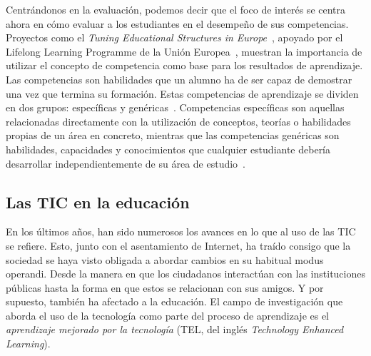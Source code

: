 Centrándonos en la evaluación, podemos decir que el foco de interés se centra ahora en cómo evaluar a los estudiantes en el desempeño de sus competencias. Proyectos como el \emph{Tuning Educational Structures in Europe}~\cite{gonzalez2005tuning}, apoyado por el Lifelong Learning Programme de la Unión Europea~\cite{llp:2006}, muestran la importancia de utilizar el concepto de competencia como base para los resultados de aprendizaje. Las competencias son habilidades que un alumno ha de ser capaz de demostrar una vez que termina su formación. Estas competencias de aprendizaje se dividen en dos grupos: específicas y genéricas~\cite{strijbos2015criteria}. Competencias específicas son aquellas relacionadas directamente con la utilización de conceptos, teorías o habilidades propias de un área en concreto, mientras que las competencias genéricas son habilidades, capacidades y conocimientos que cualquier estudiante debería desarrollar independientemente de su área de estudio~\cite{gonzalez2005tuning}. 

\subsection*{Las TIC en la educación}

En los últimos años, han sido numerosos los avances en lo que al uso de las TIC se refiere. Esto, junto con el asentamiento de Internet, ha traído consigo que la sociedad se haya visto obligada a abordar cambios en su habitual modus operandi. Desde la manera en que los ciudadanos interactúan con las instituciones públicas hasta la forma en que estos se relacionan con sus amigos. Y por supuesto, también ha afectado a la educación. El campo de investigación que aborda el uso de la tecnología como parte del proceso de aprendizaje es el \emph{aprendizaje mejorado por la tecnología} (TEL, del inglés \emph{Technology Enhanced Learning}). 

